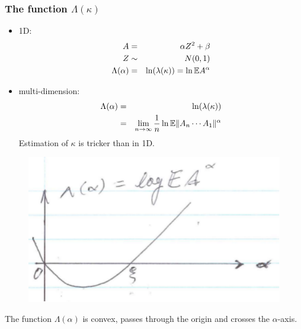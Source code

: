\documentclass{beamer}
\begin{document}
\begin{frame}
  \frametitle{The function $\Lambda(\kappa)$}
  \begin{minipage}{0.5\linewidth}
      \begin{itemize}
      \item 1D:
        \begin{eqnarray*}
          A &=& \alpha Z^2 + \beta \\
          Z &\sim& N(0,1) \\
          \Lambda(\alpha) &=& \ln(\lambda(\kappa)) = \ln \mathbb{E} A^\alpha          
        \end{eqnarray*}
      \item multi-dimension:
        \begin{eqnarray*}
          \Lambda(\alpha) &=& \ln(\lambda(\kappa)) \\
          &=& \lim_{n \to \infty} {1 \over n} \ln \mathbb{E} \|A_n \cdots A_1\|^\alpha
        \end{eqnarray*}
        Estimation of $\kappa$ is tricker than in 1D.
      \end{itemize}
  \end{minipage}\hfill
  \begin{minipage}{0.4\linewidth}
    \begin{figure}
      \centering
      \includegraphics[width=1.0\linewidth]{pic2.pdf}
    \end{figure}
    \begin{scriptsize}
    The function $\Lambda(\alpha)$ is convex, passes through the origin
    and crosses the $\alpha$-axis.
    \end{scriptsize}
  \end{minipage}
\end{frame}
\end{document}

